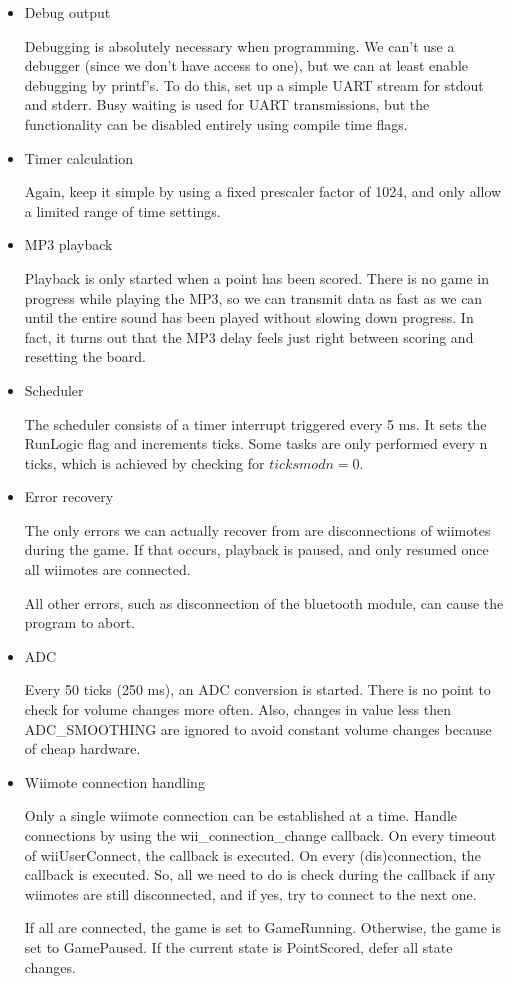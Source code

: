 \documentclass[12pt,a4paper,titlepage,oneside]{article}
\begin{document}
\begin{itemize}
 
 \item Debug output
 
 Debugging is absolutely necessary when programming. We can't use a debugger (since we don't
 have access to one), but we can at least enable debugging by printf's. To do this, set up a simple
 UART stream for stdout and stderr. Busy waiting is used for UART transmissions, but the functionality
 can be disabled entirely using compile time flags.
 
 
 \item Timer calculation
 
 Again, keep it simple by using a fixed prescaler factor of 1024, and only allow a limited range
 of time settings.
 
 
 \item MP3 playback
 
 Playback is only started when a point has been scored. There is no game in progress while playing the MP3,
 so we can transmit data as fast as we can until the entire sound has been played without slowing
 down progress. In fact, it turns out that the MP3 delay feels just right between scoring and resetting
 the board.
 
 
 \item Scheduler
 
 The scheduler consists of a timer interrupt triggered every 5 ms. It sets the RunLogic flag
 and increments ticks. Some tasks are only performed every n ticks, which is achieved by
 checking for $ticks mod n = 0$.
 
 
 \item Error recovery
 
 The only errors we can actually recover from are disconnections of wiimotes during the game.
 If that occurs, playback is paused, and only resumed once all wiimotes are connected.
 
 All other errors, such as disconnection of the bluetooth module, can cause the program to abort.
 
 
 \item ADC
 
 Every 50 ticks (250 ms), an ADC conversion is started. There is no point to check for volume changes
 more often. Also, changes in value less then ADC\_SMOOTHING are ignored to avoid constant volume changes
 because of cheap hardware.
 
 
 \item Wiimote connection handling
 
 Only a single wiimote connection can be established at a time. Handle connections by using the 
 wii\_connection\_change callback. On every timeout of wiiUserConnect, the callback is executed.
 On every (dis)connection, the callback is executed. So, all we need to do is check during the callback
 if any wiimotes are still disconnected, and if yes, try to connect to the next one.
 
 If all are connected, the game is set to GameRunning. Otherwise, the game is set to GamePaused. If
 the current state is PointScored, defer all state changes.
 
 
\end{itemize}
\end{document}
